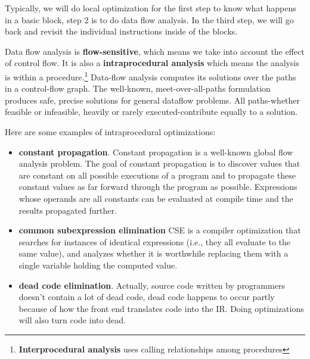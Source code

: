 Typically, we will do local optimization for the first step to know what happens in a
basic block, step 2 is to do data flow analysis. In the third step, we will go back and
revisit the individual instructions inside of the blocks.


Data flow analysis is \textbf{flow-sensitive}, which means we take into account
the effect of control flow. It is also a \textbf{intraprocedural analysis} which means
the analysis is within a procedure.\footnote{\textbf{Interprocedural analysis} uses calling relationships among
	procedures} Data-flow analysis computes its solutions over the paths in
a control-flow graph. The well-known, meet-over-all-paths
formulation produces safe, precise solutions for general dataflow problems. All paths-whether feasible or infeasible,
heavily or rarely executed-contribute equally to a solution.

Here are some examples of intraprocedural optimizations:

\begin{itemize}
	\item \textbf{constant propagation}. Constant propagation is a well-known global flow analysis
	      problem. The goal of constant propagation is to discover values that are constant on all possible
	      executions of a program and to propagate these constant values as far forward through the program
	      as possible. Expressions whose operands are all constants can be evaluated at compile time and the
	      results propagated further.

	\item \textbf{common subexpression elimination}  CSE is a compiler
	      optimization that searches for instances of identical expressions
	      (i.e., they all evaluate to the same value),
	      and analyzes whether it is worthwhile replacing them with a
	      single variable holding the computed value.

	\item \textbf{dead code elimination}. Actually, source code written by programmers doesn't contain
	      a lot of dead code, dead code happens to occur partly because of how the front end translates code into
	      the IR. Doing optimizations will also turn code into dead.

\end{itemize}


